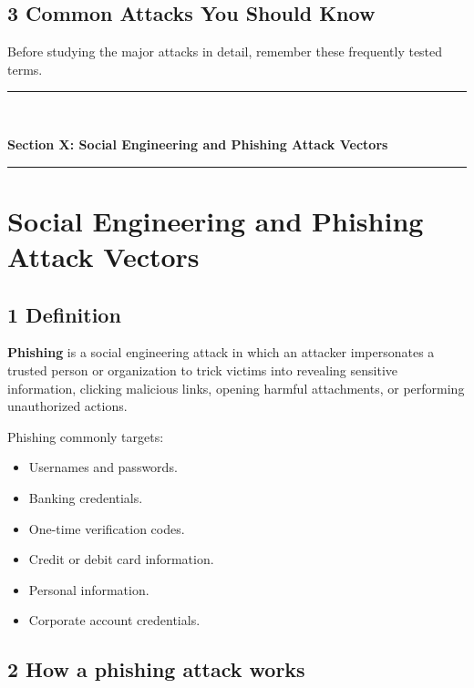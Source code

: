 \subsection{3 Common Attacks You Should Know}

Before studying the major attacks in detail, remember these frequently tested terms.



\newpage
\begin{center}
\vspace{0.5em}
{\color{primary}\rule{0.45\textwidth}{1.2pt}\\[4pt]}
{\Large\bfseries\color{primary} Section X: Social Engineering and Phishing Attack Vectors\\[2pt]}
{\color{primary}\rule{0.45\textwidth}{1.2pt}}
\vspace{0.5em}
\end{center}

\section{Social Engineering and Phishing Attack Vectors}


\subsection{1 Definition}

\textbf{Phishing} is a social engineering attack in which an attacker impersonates a trusted person or organization to trick victims into revealing sensitive information, clicking malicious links, opening harmful attachments, or performing unauthorized actions.

Phishing commonly targets:

\begin{itemize}
\item Usernames and passwords.
\item Banking credentials.
\item One-time verification codes.
\item Credit or debit card information.
\item Personal information.
\item Corporate account credentials.
\end{itemize}

\subsection{2 How a phishing attack works}

